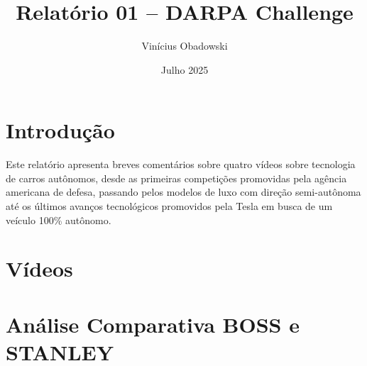 \documentclass[12pt, a4paper]{article}
\title{Relatório 01 -- DARPA Challenge}
\author{Vinícius Obadowski}
\date{Julho 2025}
\begin{document}
\maketitle

\section{Introdução}

Este relatório apresenta breves comentários sobre quatro vídeos \cite{darpa2005,tedtalk,dojo,audiA8} sobre tecnologia de carros autônomos, desde as primeiras competições promovidas pela agência americana de defesa, passando pelos modelos de luxo com direção semi-autônoma até os últimos avanços tecnológicos promovidos pela Tesla em busca de um veículo 100\% autônomo.



\section{Vídeos}



\section{Análise Comparativa BOSS e STANLEY}




\end{document}
